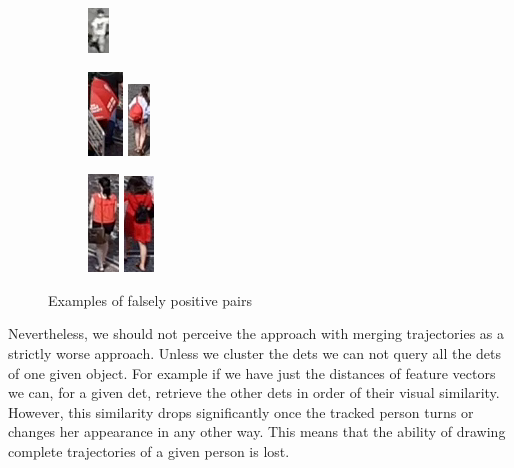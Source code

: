 \begin{figure}
\begin{subfigure}[b]{0.3\textwidth}
         \includegraphics[height=\fpheight]{img/fp_3_b.png}
    \end{subfigure}
    \begin{subfigure}[b]{0.3\textwidth}
         \centering
         \includegraphics[height=\fpheight]{img/fp_4_a.png}
         \includegraphics[height=\fpheight]{img/fp_4_b.png}
    \end{subfigure}
    \begin{subfigure}[b]{0.3\textwidth}
         \centering
         \includegraphics[height=\fpheight]{img/fp_5_a.png}
         \includegraphics[height=\fpheight]{img/fp_5_b.png}
    \end{subfigure}
    \caption{Examples of falsely positive pairs}
    \label{fig:fp_pairs}

\end{figure}
Nevertheless, we should not perceive the approach with merging trajectories as a strictly worse approach. Unless we cluster the \glspl{det} we can not query all the \glspl{det} of one given object. For example if we have just the distances of feature vectors we can, for a given \gls{det}, retrieve the other \glspl{det} in order of their visual similarity. However, this similarity drops significantly once the tracked person turns or changes her appearance in any other way. This means that the ability of drawing complete trajectories of a given person is lost.

